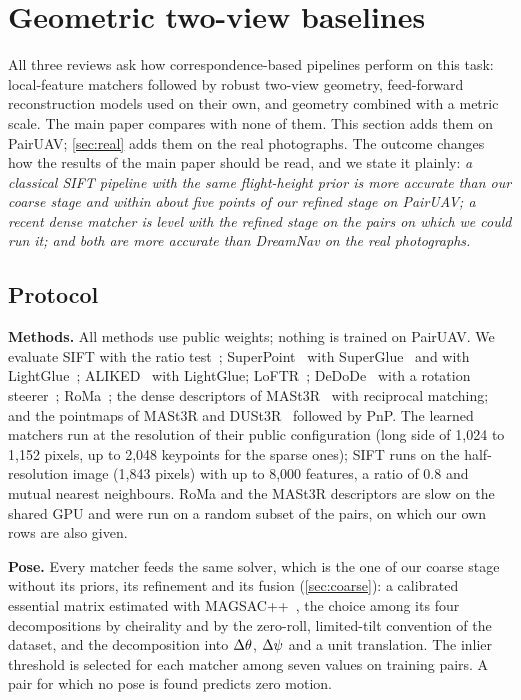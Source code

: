 \section{Geometric two-view baselines}
\label{sec:geometric}

All three reviews ask how correspondence-based pipelines perform on this task: local-feature matchers followed by robust two-view geometry, feed-forward reconstruction models used on their own, and geometry combined with a metric scale. The main paper compares with none of them. This section adds them on PairUAV; \cref{sec:real} adds them on the real photographs. The outcome changes how the results of the main paper should be read, and we state it plainly: \emph{a classical SIFT pipeline with the same flight-height prior is more accurate than our coarse stage and within about five points of our refined stage on PairUAV; a recent dense matcher is level with the refined stage on the pairs on which we could run it; and both are more accurate than DreamNav on the real photographs.}

\subsection{Protocol}
\label{sec:geoprotocol}

\noindent\textbf{Methods.} All methods use public weights; nothing is trained on PairUAV. We evaluate SIFT with the ratio test~\cite{lowe2004sift}; SuperPoint~\cite{detone2018superpoint} with SuperGlue~\cite{sarlin2020superglue} and with LightGlue~\cite{lindenberger2023lightglue}; ALIKED~\cite{zhao2023aliked} with LightGlue; LoFTR~\cite{sun2021loftr}; DeDoDe~\cite{edstedt2024dedode} with a rotation steerer~\cite{bokman2024steerers}; RoMa~\cite{edstedt2024roma}; the dense descriptors of MASt3R~\cite{leroy2024mast3r} with reciprocal matching; and the pointmaps of MASt3R and DUSt3R~\cite{wang2024dust3r} followed by PnP. The learned matchers run at the resolution of their public configuration (long side of 1{,}024 to 1{,}152 pixels, up to 2{,}048 keypoints for the sparse ones); SIFT runs on the half-resolution image (1{,}843 pixels) with up to 8{,}000 features, a ratio of 0.8 and mutual nearest neighbours. RoMa and the MASt3R descriptors are slow on the shared GPU and were run on a random subset of the pairs, on which our own rows are also given.

\noindent\textbf{Pose.} Every matcher feeds the same solver, which is the one of our coarse stage without its priors, its refinement and its fusion (\cref{sec:coarse}): a calibrated essential matrix estimated with MAGSAC++~\cite{barath2020magsacpp}, the choice among its four decompositions by cheirality and by the zero-roll, limited-tilt convention of the dataset, and the decomposition into $\Delta\theta$, $\Delta\psi$ and a unit translation. The inlier threshold is selected for each matcher among seven values on \gbNcal{} training pairs. A pair for which no pose is found predicts zero motion.

